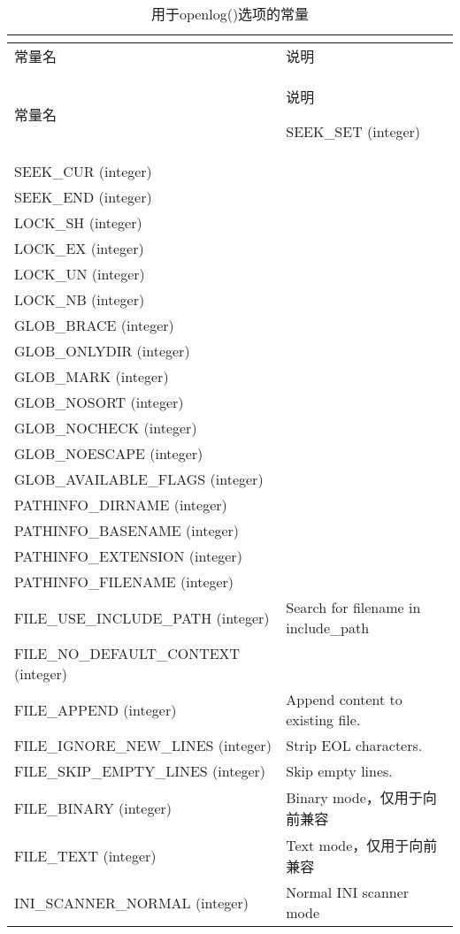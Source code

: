 \begin{longtable}{|m{100pt}|m{300pt}|}
\multicolumn{2}{r}{}
\tabularnewline\hline
常量名&说明
\endhead

\caption{用于openlog()选项的常量}\\
\hline
常量名&说明
\endfirsthead

\multicolumn{2}{r}{}
\endfoot

\endlastfoot
\hline
SEEK\_SET (integer)&\\
\hline
SEEK\_CUR (integer)&\\
\hline
SEEK\_END (integer)&\\
\hline
LOCK\_SH (integer)&\\
\hline
LOCK\_EX (integer)&\\
\hline
LOCK\_UN (integer)&\\
\hline
LOCK\_NB (integer)&\\
\hline
GLOB\_BRACE (integer)&\\
\hline
GLOB\_ONLYDIR (integer)&\\
\hline
GLOB\_MARK (integer)&\\
\hline
GLOB\_NOSORT (integer)&\\
\hline
GLOB\_NOCHECK (integer)&\\
\hline
GLOB\_NOESCAPE (integer)&\\
\hline
GLOB\_AVAILABLE\_FLAGS (integer)&\\
\hline
PATHINFO\_DIRNAME (integer)&\\
\hline
PATHINFO\_BASENAME (integer)&\\
\hline
PATHINFO\_EXTENSION (integer)&\\
\hline
PATHINFO\_FILENAME (integer)&\\
\hline
FILE\_USE\_INCLUDE\_PATH (integer)&Search for filename in include\_path\\
\hline
FILE\_NO\_DEFAULT\_CONTEXT (integer)&\\
\hline
FILE\_APPEND (integer)&Append content to existing file.\\
\hline
FILE\_IGNORE\_NEW\_LINES (integer)&Strip EOL characters.\\
\hline
FILE\_SKIP\_EMPTY\_LINES (integer)&Skip empty lines.\\
\hline
FILE\_BINARY (integer)&Binary mode，仅用于向前兼容\\
\hline
FILE\_TEXT (integer)&Text mode，仅用于向前兼容\\
\hline
INI\_SCANNER\_NORMAL (integer)&Normal INI scanner mode\\

\end{longtable}
